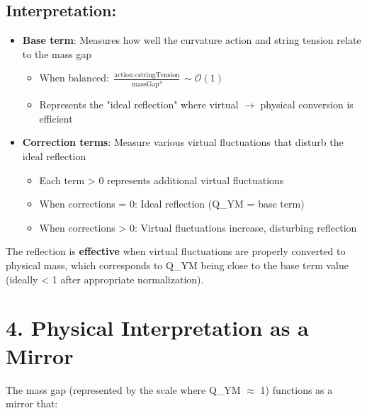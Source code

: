 \documentclass[11pt]{article}
\begin{document}
\subsection{Interpretation:}
\begin{itemize}
\item \textbf{Base term}: Measures how well the curvature action and string tension relate to the mass gap
  \begin{itemize}
  \item When balanced: $\frac{\text{action} \times \text{stringTension}}{\text{massGap}^4} \sim \mathcal{O}(1)$
  \item Represents the "ideal reflection" where virtual $\rightarrow$ physical conversion is efficient
  \end{itemize}
\item \textbf{Correction terms}: Measure various virtual fluctuations that disturb the ideal reflection
  \begin{itemize}
  \item Each term > 0 represents additional virtual fluctuations
  \item When corrections = 0: Ideal reflection (Q_YM = base term)
  \item When corrections > 0: Virtual fluctuations increase, disturbing reflection
  \end{itemize}
\end{itemize}

The reflection is \textbf{effective} when virtual fluctuations are properly converted to physical mass, which corresponds to Q_YM being close to the base term value (ideally < 1 after appropriate normalization).

\section{4. Physical Interpretation as a Mirror}

The mass gap (represented by the scale where Q_YM $\approx$ 1) functions as a mirror that:
\end{document}
